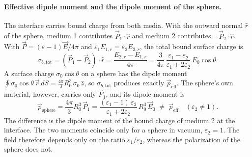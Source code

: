 \paragraph{Effective dipole moment and the dipole moment of the sphere.}
The interface carries bound charge from both media. With the outward normal $\hat r$ of the sphere, medium 1 contributes $\vec P_1\cdot\hat r$ and medium 2 contributes $-\vec P_2\cdot\hat r$. With $\vec P = (\varepsilon - 1)\vec E/4\pi$ and $\varepsilon_1E_{1,r} = \varepsilon_2E_{2,r}$, the total bound surface charge is
\begin{equation*}
    \sigma_{b,\text{tot}} = \left(\vec P_1 - \vec P_2\right)\cdot\hat r
    = \frac{E_{2,r} - E_{1,r}}{4\pi}
    = \frac{3}{4\pi}\,\frac{\varepsilon_1 - \varepsilon_2}{\varepsilon_1 + 2\varepsilon_2}\,E_0\cos\theta.
\end{equation*}
A surface charge $\sigma_0\cos\theta$ on a sphere has the dipole moment $\oint \sigma_0\cos\theta\,\vec r\,dS = \tfrac{4\pi}{3}R_0^3\,\sigma_0\,\hat z$, so $\sigma_{b,\text{tot}}$ produces exactly $\vec p_{\text{eff}}$. The sphere's own material, however, carries only $\vec P_1$, and its dipole moment is
\begin{equation}
    \boxed{
    \vec p_{\text{sphere}} = \frac{4\pi}{3}R_0^3\,\vec P_1
    = \frac{(\varepsilon_1 - 1)\,\varepsilon_2}{\varepsilon_1 + 2\varepsilon_2}\,R_0^3\,\vec E_0
    \;\neq\; \vec p_{\text{eff}} \quad (\varepsilon_2 \neq 1).
    }
\end{equation}
The difference is the dipole moment of the bound charge of medium 2 at the interface. The two moments coincide only for a sphere in vacuum, $\varepsilon_2 = 1$. The field therefore depends only on the ratio $\varepsilon_1/\varepsilon_2$, whereas the polarization of the sphere does not.